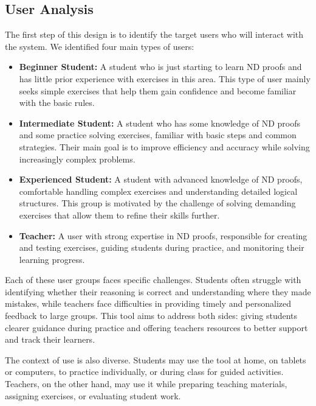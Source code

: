 \subsection{User Analysis}
The first step of this design is to identify the target users who will interact with the system. We identified four main types of users:

\begin{itemize}
\setlength{\itemsep}{5pt}
    \item \textbf{Beginner Student:} A student who is just starting to learn \gls{ND} proofs and has little prior experience with exercises in this area. This type of user mainly seeks simple exercises that help them gain confidence and become familiar with the basic rules.
    \item \textbf{Intermediate Student:} A student who has some knowledge of \gls{ND} proofs and some practice solving exercises, familiar with basic steps and common strategies. Their main goal is to improve efficiency and accuracy while solving increasingly complex problems.
    \item \textbf{Experienced Student:} A student with advanced knowledge of \gls{ND} proofs, comfortable handling complex exercises and understanding detailed logical structures. This group is motivated by the challenge of solving demanding exercises that allow them to refine their skills further.
    \item \textbf{Teacher:} A user with strong expertise in \gls{ND} proofs, responsible for creating and testing exercises, guiding students during practice, and monitoring their learning progress.
\end{itemize}

Each of these user groups faces specific challenges. Students often struggle with identifying whether their reasoning is correct and understanding where they made mistakes, while teachers face difficulties in providing timely and personalized feedback to large groups. This tool aims to address both sides: giving students clearer guidance during practice and offering teachers resources to better support and track their learners.  

The context of use is also diverse. Students may use the tool at home, on tablets or computers, to practice individually, or during class for guided activities. Teachers, on the other hand, may use it while preparing teaching materials, assigning exercises, or evaluating student work.  

